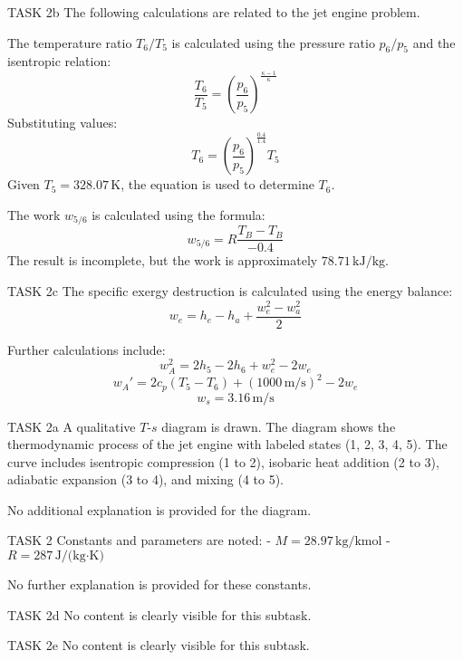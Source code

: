 TASK 2b  
The following calculations are related to the jet engine problem.  

The temperature ratio \( T_6 / T_5 \) is calculated using the pressure ratio \( p_6 / p_5 \) and the isentropic relation:  
\[
\frac{T_6}{T_5} = \left( \frac{p_6}{p_5} \right)^{\frac{\kappa - 1}{\kappa}}
\]  
Substituting values:  
\[
T_6 = \left( \frac{p_6}{p_5} \right)^{\frac{0.4}{1.4}} T_5
\]  
Given \( T_5 = 328.07 \, \text{K} \), the equation is used to determine \( T_6 \).  

The work \( w_{5/6} \) is calculated using the formula:  
\[
w_{5/6} = R \frac{T_B - T_B}{-0.4}
\]  
The result is incomplete, but the work is approximately \( 78.71 \, \text{kJ/kg} \).  

TASK 2c  
The specific exergy destruction is calculated using the energy balance:  
\[
w_e = h_e - h_a + \frac{w_e^2 - w_a^2}{2}
\]  

Further calculations include:  
\[
w_A^2 = 2h_5 - 2h_6 + w_e^2 - 2w_e
\]  
\[
w_A' = 2c_p (T_5 - T_6) + (1000 \, \text{m/s})^2 - 2w_e
\]  
\[
w_s = 3.16 \, \text{m/s}
\]  

TASK 2a  
A qualitative \( T \)-\( s \) diagram is drawn. The diagram shows the thermodynamic process of the jet engine with labeled states (1, 2, 3, 4, 5). The curve includes isentropic compression (1 to 2), isobaric heat addition (2 to 3), adiabatic expansion (3 to 4), and mixing (4 to 5).  

No additional explanation is provided for the diagram.  

TASK 2  
Constants and parameters are noted:  
- \( M = 28.97 \, \text{kg/kmol} \)  
- \( R = 287 \, \text{J/(kg·K)} \)  

No further explanation is provided for these constants.  

TASK 2d  
No content is clearly visible for this subtask.  

TASK 2e  
No content is clearly visible for this subtask.